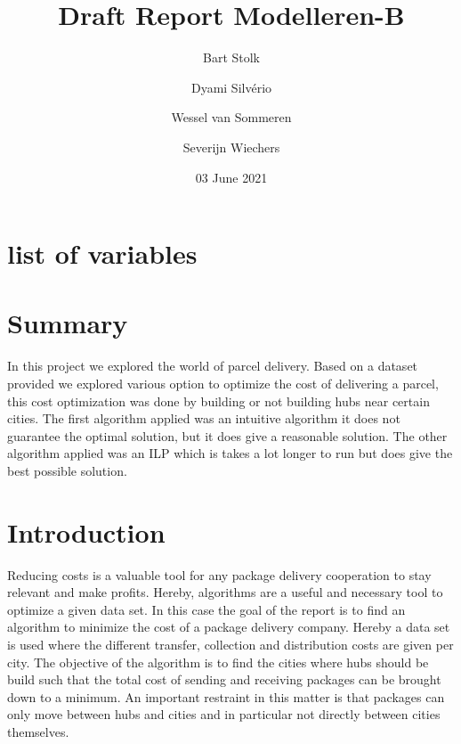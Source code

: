 \documentclass{article}
\title{Draft Report Modelleren-B}
\author{Bart Stolk \and Dyami Silvério \and Wessel van Sommeren \and Severijn Wiechers}
\date{03 June 2021}
\begin{document}
\maketitle


\newpage
\section*{list of variables}


\newpage
\section*{Summary}
In this project we explored the world of parcel delivery. Based on a dataset provided we explored various option to optimize the cost of delivering a parcel, this cost optimization was done by building or not building hubs near certain cities. The first algorithm applied was an intuitive algorithm it does not guarantee the optimal solution, but it does give a reasonable solution. The other algorithm applied was an ILP which is takes a lot longer to run but does give the best possible solution.





\newpage
\tableofcontents



\newpage
\section{Introduction}



Reducing costs is a valuable tool for any package delivery cooperation to stay relevant and make profits. Hereby, algorithms are a useful and necessary tool to optimize a given data set. In this case the goal of the report is to find an algorithm to minimize the cost of a package delivery company. Hereby a data set is used where the different transfer, collection and distribution costs are given per city. The objective of the algorithm is to find the cities where hubs should be build such that the total cost of sending and receiving packages can be brought down to a minimum. An important restraint in this matter is that packages can only move between hubs and cities and in particular not directly between cities themselves. %
\end{document}

